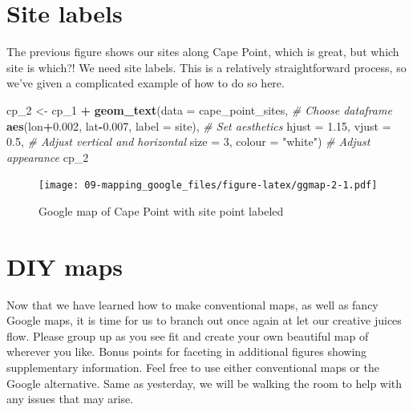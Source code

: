 \documentclass[]{book}
\newenvironment{Shaded}{\begin{snugshade}}{\end{snugshade}}
\newcommand{\KeywordTok}[1]{\textcolor[rgb]{0.13,0.29,0.53}{\textbf{#1}}}
\newcommand{\DataTypeTok}[1]{\textcolor[rgb]{0.13,0.29,0.53}{#1}}
\newcommand{\DecValTok}[1]{\textcolor[rgb]{0.00,0.00,0.81}{#1}}
\newcommand{\FloatTok}[1]{\textcolor[rgb]{0.00,0.00,0.81}{#1}}
\newcommand{\StringTok}[1]{\textcolor[rgb]{0.31,0.60,0.02}{#1}}
\newcommand{\CommentTok}[1]{\textcolor[rgb]{0.56,0.35,0.01}{\textit{#1}}}
\newcommand{\OperatorTok}[1]{\textcolor[rgb]{0.81,0.36,0.00}{\textbf{#1}}}
\newcommand{\NormalTok}[1]{#1}
\theoremstyle{definition}
\theoremstyle{definition}
\theoremstyle{definition}
\theoremstyle{remark}
\begin{document}
\section{Site labels}\label{site-labels}

The previous figure shows our sites along Cape Point, which is great,
but which site is which?! We need site labels. This is a relatively
straightforward process, so we've given a complicated example of how to
do so here.

\begin{Shaded}
\begin{Highlighting}[]
\NormalTok{cp_}\DecValTok{2}\NormalTok{ <-}\StringTok{ }\NormalTok{cp_}\DecValTok{1} \OperatorTok{+}
\StringTok{  }\KeywordTok{geom_text}\NormalTok{(}\DataTypeTok{data =}\NormalTok{ cape_point_sites, }\CommentTok{# Choose dataframe}
            \KeywordTok{aes}\NormalTok{(lon}\OperatorTok{+}\FloatTok{0.002}\NormalTok{, lat}\OperatorTok{-}\FloatTok{0.007}\NormalTok{, }\DataTypeTok{label =}\NormalTok{ site), }\CommentTok{# Set aesthetics}
            \DataTypeTok{hjust =} \FloatTok{1.15}\NormalTok{, }\DataTypeTok{vjust =} \FloatTok{0.5}\NormalTok{, }\CommentTok{# Adjust vertical and horizontal}
            \DataTypeTok{size =} \DecValTok{3}\NormalTok{, }\DataTypeTok{colour =} \StringTok{"white"}\NormalTok{) }\CommentTok{# Adjust appearance}
\NormalTok{cp_}\DecValTok{2}
\end{Highlighting}
\end{Shaded}

\begin{figure}
\centering
\texttt{[image: 09-mapping\_google\_files/figure-latex/ggmap-2-1.pdf]}
\caption{\label{fig:ggmap-2}Google map of Cape Point with site point
labeled}
\end{figure}

\section{DIY maps}\label{diy-maps}

Now that we have learned how to make conventional maps, as well as fancy
Google maps, it is time for us to branch out once again at let our
creative juices flow. Please group up as you see fit and create your own
beautiful map of wherever you like. Bonus points for faceting in
additional figures showing supplementary information. Feel free to use
either conventional maps or the Google alternative. Same as yesterday,
we will be walking the room to help with any issues that may arise.
\end{document}
